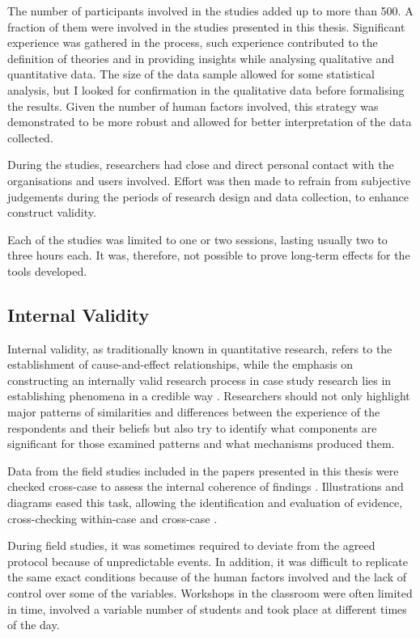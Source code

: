 The number of participants involved in the studies added up to more than 500. A fraction of them were involved in the studies presented in this thesis. Significant experience was gathered in the process, such experience contributed to the definition of theories and in providing insights while analysing qualitative and quantitative data.
The size of the data sample allowed for some statistical analysis, but I looked for confirmation in the qualitative data before formalising the results. Given the number of human factors involved, this strategy was demonstrated to be more robust and allowed for better interpretation of the data collected.

During the studies, researchers had close and direct personal contact with the organisations and users involved. Effort was then made to refrain from subjective judgements during the periods of research design and data collection, to enhance construct validity.

Each of the studies was limited to one or two sessions, lasting usually two to three hours each. It was, therefore, not possible to prove long-term effects for the tools developed.

\subsection{Internal Validity}
Internal validity, as traditionally known in quantitative research, refers to the establishment of cause-and-effect relationships, while the emphasis on constructing an internally valid research process in case study research lies in establishing phenomena in a credible way \autocite{riege_validity_2003}. Researchers should not only highlight major patterns of similarities and differences between the experience of the respondents and their beliefs but also try to identify what components are significant for those examined patterns and what mechanisms produced them.

Data from the field studies included in the papers presented in this thesis were checked cross-case to assess the internal coherence of findings \autocite{miles_qualitative_1994}. Illustrations and diagrams eased this task, allowing the identification and evaluation of evidence, cross-checking within-case and cross-case \autocite{yin_case_2017}.

During field studies, it was sometimes required to deviate from the agreed protocol because of unpredictable events. In addition, it was difficult to replicate the same exact conditions because of the human factors involved and the lack of control over some of the variables. Workshops in the classroom were often limited in time, involved a variable number of students and took place at different times of the day.

